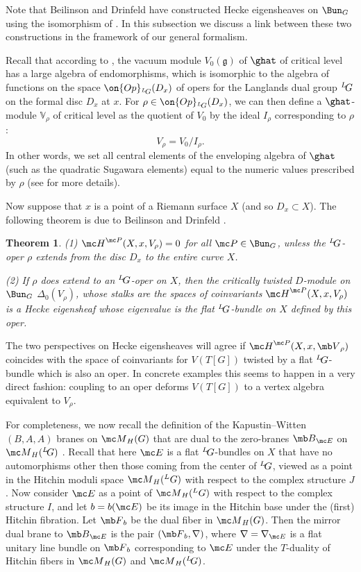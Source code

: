 \documentclass[11pt,reqno]{amsart}
\theoremstyle{plain}
\newtheorem{thm}[theorem]{Theorem}
\numberwithin{equation}{section}
\newcommand{\g}{\mathfrak{g}}
\def\neg{\negthinspace}
\def\LG{{}^L\neg G}
\theoremstyle{definition}
\begin{document}
Note that Beilinson and Drinfeld have constructed Hecke
eigensheaves on $\Bun_G$ using the isomorphism of \cite{FF,F:wak}. In
this subsection we discuss a link between these two constructions in
the framework of our general formalism.

Recall that according to \cite{FF,F:wak}, the vacuum module $V_0(\g)$
of $\ghat$ of critical level has a large algebra of endomorphisms,
which is isomorphic to the algebra of functions on the space
$\on{Op}_{\LG}(D_x)$ of opers for the Langlands dual group $\LG$ on
the formal disc $D_x$ at $x$. For $\rho \in
\on{Op}_{\LG}(D_x)$, we can then define a $\ghat$-module ${\mathbb
  V}_\rho$ of critical level as the quotient of $V_0$ by the ideal
$I_\rho$ corresponding to $\rho$:
$$
V_\rho = V_0/I_\rho.
$$
In other words, we set all central elements of the enveloping algebra
of $\ghat$ (such as the quadratic Sugawara elements) equal to the
numeric values prescribed by $\rho$ (see \cite{F:review} for more
details).

Now suppose that $x$ is a point of a Riemann surface $X$ (and so $D_x
\subset X$). The following theorem is due to Beilinson and Drinfeld
\cite{BD}.

\begin{thm} \hfill

  {\em (1)} ${\mc H}^{\mc P}(X,x,V_\rho) = 0$ for all ${\mc
    P} \in \Bun_G$, unless the $\LG$-oper $\rho$ extends from the
  disc $D_x$ to the entire curve $X$.

  {\em (2)} If $\rho$ does extend to an $\LG$-oper on $X$, then the
  critically twisted $D$-module on $\Bun_G$ $\Delta_0(V_\rho)$, whose
  stalks are the spaces of coinvariants ${\mc H}^{\mc
    P}(X,x,V_\rho)$ is a Hecke eigensheaf whose eigenvalue is the
  flat $\LG$-bundle on $X$ defined by this oper.

\end{thm}

The two perspectives on Hecke eigensheaves will agree if 
${\mc H}^{\mc P}(X,x,{\mb V}_\rho)$ coincides with the space of coinvariants for 
$V(T[G])$ twisted by a flat $\LG$-bundle which is also an oper. 
In concrete examples this seems to happen in a very direct fashion: 
coupling to an oper deforms $V(T[G])$ to a vertex algebra equivalent to 
$V_\rho$.

For completeness, we now recall the definition of the Kapustin--Witten $(B,A,A)$ branes on
${\mc M}_H(G)$ that are dual to the zero-branes ${\mb B}_{\mc E}$ on
${\mc M}_H(\LG)$ \cite{KW}. Recall that here ${\mc E}$ is a flat
$\LG$-bundles on $X$ that have no automorphisms other then those
coming from the center of $\LG$, viewed as a point in the Hitchin
moduli space ${\mc M}_H({}^L G)$ with respect to the complex structure
$J$. Now consider ${\mc E}$ as a point of ${\mc M}_H({}^L G)$ with
respect to the complex structure $I$, and let $b = b({\mc E})$ be its
image in the Hitchin base under the (first) Hitchin fibration. Let
${\mb F}_b$ be the dual fiber in ${\mc M}_H(G)$. Then the mirror dual
brane to ${\mb B}_{{\mc E}}$ is the pair $({\mb F}_b,\nabla)$, where
$\nabla=\nabla_{\mc E}$ is a flat unitary line bundle on ${\mb F}_b$
corresponding to ${\mc E}$ under the $T$-duality of Hitchin fibers in
${\mc M}_H(G)$ and ${\mc M}_H(\LG)$.
\end{document}
